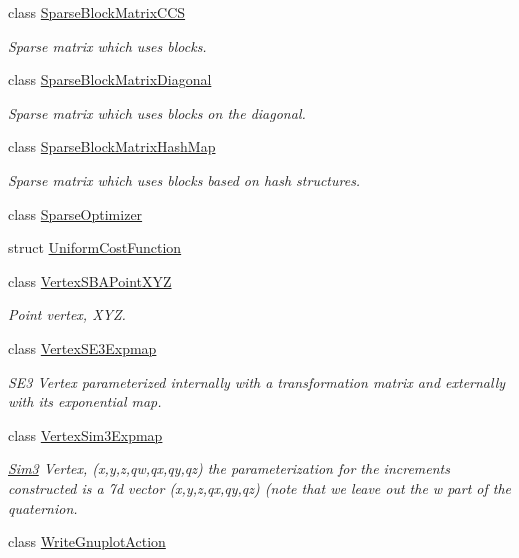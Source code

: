 \begin{DoxyCompactItemize}
class \hyperlink{classg2o_1_1SparseBlockMatrixCCS}{Sparse\+Block\+Matrix\+C\+CS}
\begin{DoxyCompactList}\small\item\em Sparse matrix which uses blocks. \end{DoxyCompactList}\item 
class \hyperlink{classg2o_1_1SparseBlockMatrixDiagonal}{Sparse\+Block\+Matrix\+Diagonal}
\begin{DoxyCompactList}\small\item\em Sparse matrix which uses blocks on the diagonal. \end{DoxyCompactList}\item 
class \hyperlink{classg2o_1_1SparseBlockMatrixHashMap}{Sparse\+Block\+Matrix\+Hash\+Map}
\begin{DoxyCompactList}\small\item\em Sparse matrix which uses blocks based on hash structures. \end{DoxyCompactList}\item 
class \hyperlink{classg2o_1_1SparseOptimizer}{Sparse\+Optimizer}
\item 
struct \hyperlink{structg2o_1_1UniformCostFunction}{Uniform\+Cost\+Function}
\item 
class \hyperlink{classg2o_1_1VertexSBAPointXYZ}{Vertex\+S\+B\+A\+Point\+X\+YZ}
\begin{DoxyCompactList}\small\item\em Point vertex, X\+YZ. \end{DoxyCompactList}\item 
class \hyperlink{classg2o_1_1VertexSE3Expmap}{Vertex\+S\+E3\+Expmap}
\begin{DoxyCompactList}\small\item\em S\+E3 Vertex parameterized internally with a transformation matrix and externally with its exponential map. \end{DoxyCompactList}\item 
class \hyperlink{classg2o_1_1VertexSim3Expmap}{Vertex\+Sim3\+Expmap}
\begin{DoxyCompactList}\small\item\em \hyperlink{structg2o_1_1Sim3}{Sim3} Vertex, (x,y,z,qw,qx,qy,qz) the parameterization for the increments constructed is a 7d vector (x,y,z,qx,qy,qz) (note that we leave out the w part of the quaternion. \end{DoxyCompactList}\item 
class \hyperlink{classg2o_1_1WriteGnuplotAction}{Write\+Gnuplot\+Action}
\end{DoxyCompactItemize}
